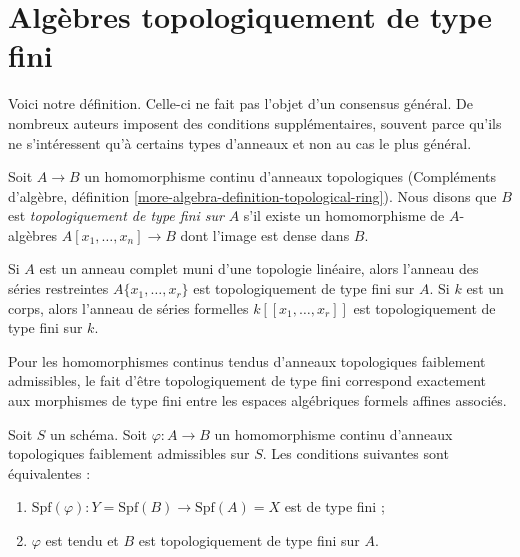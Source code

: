 \section{Algèbres topologiquement de type fini}
\label{section-tft}

\noindent
Voici notre définition. Celle-ci ne fait pas l'objet d'un consensus général.
De nombreux auteurs imposent des conditions supplémentaires, souvent parce qu'ils ne
s'intéressent qu'à certains types d'anneaux et non au cas le plus général.

\begin{definition}
\label{definition-topologically-finite-type}
Soit $A \to B$ un homomorphisme continu d'anneaux topologiques
(Compléments d'algèbre, définition \ref{more-algebra-definition-topological-ring}).
Nous disons que $B$ est {\it topologiquement de type fini sur} $A$ s'il
existe un homomorphisme de $A$-algèbres $A[x_1, \ldots, x_n] \to B$ dont
l'image est dense dans $B$.
\end{definition}

\noindent
Si $A$ est un anneau complet muni d'une topologie linéaire, alors l'anneau des
séries restreintes $A\{x_1, \ldots, x_r\}$ est topologiquement de type
fini sur $A$. Si $k$ est un corps, alors l'anneau de séries formelles
$k[[x_1, \ldots, x_r]]$ est topologiquement de type fini sur $k$.

\medskip\noindent
Pour les homomorphismes continus tendus d'anneaux topologiques faiblement admissibles,
le fait d'être topologiquement de type fini correspond exactement aux morphismes
de type fini entre les espaces algébriques formels affines associés.

\begin{lemma}
\label{lemma-topologically-finite-type-finite-type}
Soit $S$ un schéma. Soit $\varphi : A \to B$ un homomorphisme continu d'anneaux
topologiques faiblement admissibles sur $S$. Les conditions suivantes
sont équivalentes :
\begin{enumerate}
\item $\text{Spf}(\varphi) : Y = \text{Spf}(B) \to \text{Spf}(A) = X$
est de type fini ;
\item $\varphi$ est tendu et $B$ est topologiquement de type fini sur $A$.
\end{enumerate}
\end{lemma}

